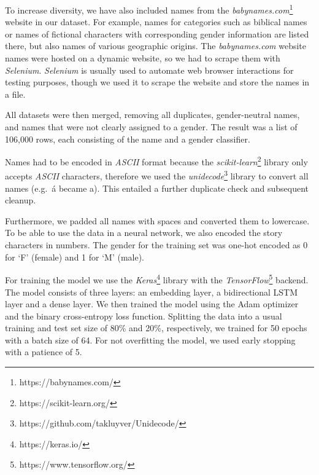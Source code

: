 To increase diversity, we have also included names from the \emph{babynames.com}\footnote{https://babynames.com/} website in our dataset.
For example, names for categories such as biblical names or names of fictional characters with corresponding gender information are listed there, but also names of various geographic origins.
The \emph{babynames.com} website names were hosted on a dynamic website, so we had to scrape them with \emph{Selenium}.
\emph{Selenium} is usually used to automate web browser interactions for testing purposes, though we used it to scrape the website and store the names in a file.

All datasets were then merged, removing all duplicates, gender-neutral names, and names that were not clearly assigned to a gender.
The result was a list of 106,000 rows, each consisting of the name and a gender classifier.


Names had to be encoded in \emph{ASCII} format because the \emph{scikit-learn}\footnote{https://scikit-learn.org/} library only accepts \emph{ASCII} characters, therefore we used the \emph{unidecode}\footnote{https://github.com/takluyver/Unidecode/} library to convert all names (e.g.~á became a).
This entailed a further duplicate check and subsequent cleanup.

Furthermore, we padded all names with spaces and converted them to lowercase.
To be able to use the data in a neural network, we also encoded the story characters in numbers.
The gender for the training set was one-hot encoded as 0 for `F' (female) and 1 for `M' (male).


For training the model we use the \emph{Keras}\footnote{https://keras.io/} library with the \emph{TensorFlow}\footnote{https://www.tensorflow.org/} backend.
The model consists of three layers: an embedding layer, a bidirectional LSTM layer and a dense layer.
We then trained the model using the Adam optimizer and the binary cross-entropy loss function.
Splitting the data into a usual training and test set size of 80\% and 20\%, respectively, we trained for 50 epochs with a batch size of 64.
For not overfitting the model, we used early stopping with a patience of 5.


